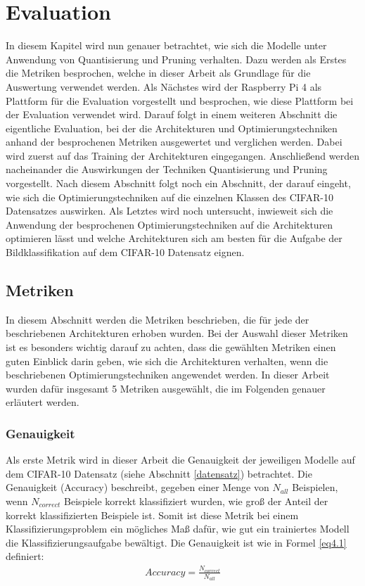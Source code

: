 \chapter{Evaluation}
\label{evaluation}
In diesem Kapitel wird nun genauer betrachtet, wie sich die Modelle unter Anwendung von Quantisierung und Pruning verhalten. Dazu werden als Erstes die Metriken besprochen, welche in dieser Arbeit als Grundlage für die Auswertung verwendet werden. Als Nächstes wird der Raspberry Pi 4 als Plattform für die Evaluation vorgestellt und besprochen, wie diese Plattform bei der Evaluation verwendet wird. Darauf folgt in einem weiteren Abschnitt die eigentliche Evaluation, bei der die Architekturen und Optimierungstechniken anhand der besprochenen Metriken ausgewertet und verglichen werden. Dabei wird zuerst auf das Training der Architekturen eingegangen. Anschließend werden nacheinander die Auswirkungen der Techniken Quantisierung und Pruning vorgestellt. Nach diesem Abschnitt folgt noch ein Abschnitt, der darauf eingeht, wie sich die Optimierungstechniken auf die einzelnen Klassen des CIFAR-10 Datensatzes auswirken. Als Letztes wird noch untersucht, inwieweit sich die Anwendung der besprochenen Optimierungstechniken auf die Architekturen optimieren lässt und welche Architekturen sich am besten für die Aufgabe der Bildklassifikation auf dem CIFAR-10 Datensatz eignen. 



\section{Metriken}
\label{metriken}
In diesem Abschnitt werden die Metriken beschrieben, die für jede der beschriebenen Architekturen erhoben wurden. Bei der Auswahl dieser Metriken ist es besonders wichtig darauf zu achten, dass die gewählten Metriken einen guten Einblick darin geben, wie sich die Architekturen verhalten, wenn die beschriebenen Optimierungstechniken angewendet werden. In dieser Arbeit wurden dafür insgesamt 5 Metriken ausgewählt, die im Folgenden genauer erläutert werden.


\subsection{Genauigkeit}
Als erste Metrik wird in dieser Arbeit die Genauigkeit der jeweiligen Modelle auf dem CIFAR-10 Datensatz (siehe Abschnitt \ref{datensatz}) betrachtet. Die Genauigkeit (Accuracy) beschreibt, gegeben einer Menge von $N_{all}$ Beispielen, wenn $N_{correct}$ Beispiele korrekt klassifiziert wurden, wie groß der Anteil der korrekt klassifizierten Beispiele ist. Somit ist diese Metrik bei einem Klassifizierungsproblem ein mögliches Maß dafür, wie gut ein trainiertes Modell die Klassifizierungsaufgabe bewältigt. Die Genauigkeit ist wie in Formel \ref{eq4.1} definiert:
\begin{eqnarray}
\textit{Accuracy} = \frac{N_{correct}}{N_{all}}
\label{eq4.1}
\end{eqnarray}

